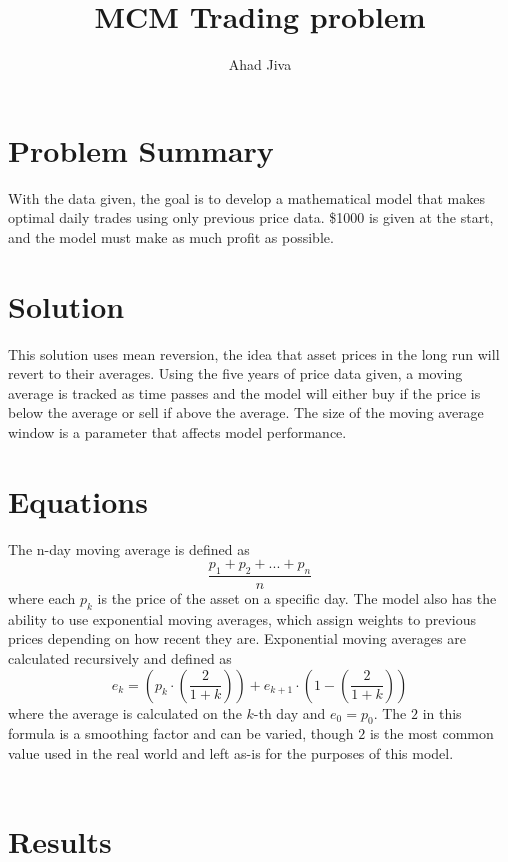 \documentclass{article}
\title{MCM Trading problem}
\author{Ahad Jiva}
\begin{document}
\maketitle

\section*{Problem Summary}
With the data given, the goal is to develop a mathematical model that makes optimal daily trades using only previous price data. 
\$1000 is given at the start, and the model must make as much profit as possible.

\section*{Solution}
This solution uses mean reversion, the idea that asset prices in the long run will revert to their averages. Using the five years of price data given, a moving average is tracked as time passes and the model will either buy if the price is below the average or sell if above the average. The size of the moving average window is a parameter that affects model performance.

\section*{Equations}
The n-day moving average is defined as
\begin{equation}
    \frac{p_1 + p_2 + ... + p_n}{n}
\end{equation}
where each $p_k$ is the price of the asset on a specific day. The model also has the ability to use exponential moving averages, which assign weights to previous
prices depending on how recent they are. Exponential moving averages are calculated recursively and defined as
\begin{equation}
    e_k = \left(p_k \cdot \left( \frac{2}{1+k} \right)\right) + e_{k+1} \cdot \left(1-\left(\frac{2}{1+k}\right)\right)
\end{equation}
where the average is calculated on the $k$-th day and $e_0 = p_0$. The $2$ in this formula is a smoothing factor and can be varied, though $2$ is the most common value used in the real world and left as-is for the purposes of this model.
\\\\
\section*{Results}
\end{document}
